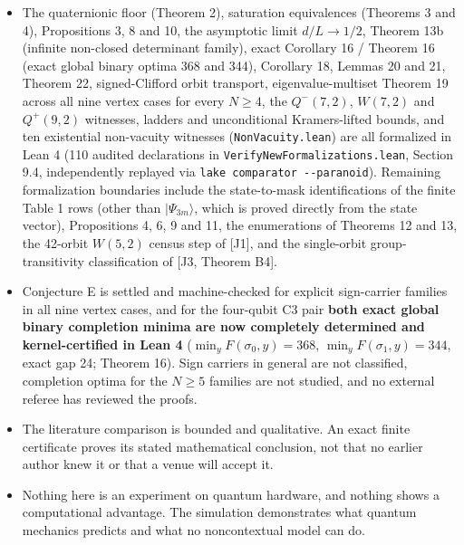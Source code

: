 \documentclass[11pt,a4paper]{article}
\begin{document}
\begin{itemize}
  6975), exact double-counting ladders, transvection invariance, Lemmas L1 and L4, and the reduction from
  \(d(Q^-(7,2)) \ge 315\) to all three exact degrees (\nolinkurl{ExactDegreesN4N5.lean}), while \nolinkurl{src/w52_census_verify.c}
  and \nolinkurl{scripts/exact_degrees_n4_n5.py} independently reproduce the 42-orbit census and certify all 42
  orbits in exact integer arithmetic with zero floating point. Moving the 42-orbit census and all 42
  integer certificates themselves into the Lean kernel remains an open formalization target (while
  \(d(Q^+(7,2)) = 315\) is already fully kernel-proved).
\item
  The quaternionic floor (Theorem 2), saturation equivalences (Theorems 3 and 4), Propositions 3, 8 and
  10, the asymptotic limit \(d/L\to1/2\), Theorem 13b (infinite non-closed determinant family), exact
  Corollary 16 / Theorem 16\textquotesingle\textquotesingle{} (exact global binary optima 368 and 344), Corollary 18, Lemmas 20 and 21,
  Theorem 22, signed-Clifford orbit transport, eigenvalue-multiset Theorem 19 across all nine vertex
  cases for every \(N\ge4\), the \(Q^-(7,2)\), \(W(7,2)\) and \(Q^+(9,2)\) witnesses, ladders and unconditional
  Kramers-lifted bounds, and ten existential non-vacuity witnesses (\texttt{NonVacuity.lean}) are all formalized
  in Lean 4 (110 audited declarations in \nolinkurl{VerifyNewFormalizations.lean}, Section 9.4, independently
  replayed via \texttt{lake\ comparator\ -\/-paranoid}). Remaining formalization boundaries include the
  state-to-mask identifications of the finite Table 1 rows (other than \(|\Psi_{3m}\rangle\), which is
  proved directly from the state vector), Propositions 4, 6, 9 and 11, the enumerations of Theorems 12
  and 13, the 42-orbit \(W(5,2)\) census step of {[}J1{]}, and the single-orbit group-transitivity
  classification of {[}J3, Theorem B4{]}.
\item
  Conjecture E is settled and machine-checked for explicit sign-carrier families in all nine vertex
  cases, and for the four-qubit C3 pair \textbf{both exact global binary completion minima are now completely
  determined and kernel-certified in Lean 4} (\(\min_y F(\sigma_0,y) = 368\), \(\min_y F(\sigma_1,y) = 344\),
  exact gap 24; Theorem 16\textquotesingle\textquotesingle). Sign carriers in general are not classified, completion optima for the
  \(N \ge 5\) families are not studied, and no external referee has reviewed the proofs.
\item
  The literature comparison is bounded and qualitative. An exact finite certificate proves its
  stated mathematical conclusion, not that no earlier author knew it or that a venue will accept it.
\item
  Nothing here is an experiment on quantum hardware, and nothing shows a computational advantage.
  The simulation demonstrates what quantum mechanics predicts and what no noncontextual model can do.
\end{itemize}
\end{document}
